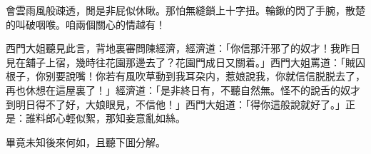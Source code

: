 \begin{myquote}
會雲雨風般疎透，閒是非屁似休瞅。那怕無縫鎖上十字扭。輪鍬的閃了手腕，散楚的叫破咽喉。咱兩個關心的情越有！
\end{myquote}

西門大姐聽見此言，背地裏審問陳經濟，經濟道：「你信那汗邪了的奴才！我昨日見在舖子上宿，幾時往花園那邊去了？花園門成日又關着。」西門大姐罵道：「賊囚根子，你别要說嘴！你若有風吹草動到我耳朶内，惹娘說我，你就信信脱脱去了，再也休想在這屋裏了！」經濟道：「是非終日有，不聽自然無。怪不的說舌的奴才到明日得不了好，大娘眼見，不信他！」西門大姐道：「得你這般說就好了。」正是：誰料郎心輕似絮，那知妾意亂如絲。

畢竟未知後來何如，且聽下囬分解。

